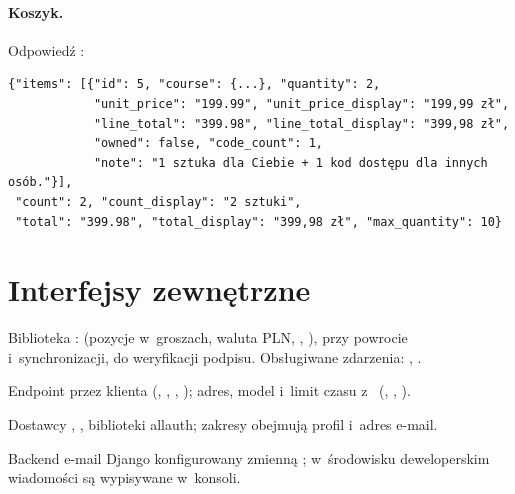 \paragraph{Koszyk.} Odpowiedź :

\begin{lstlisting}
{"items": [{"id": 5, "course": {...}, "quantity": 2,
            "unit_price": "199.99", "unit_price_display": "199,99 zł",
            "line_total": "399.98", "line_total_display": "399,98 zł",
            "owned": false, "code_count": 1,
            "note": "1 sztuka dla Ciebie + 1 kod dostępu dla innych osób."}],
 "count": 2, "count_display": "2 sztuki",
 "total": "399.98", "total_display": "399,98 zł", "max_quantity": 10}
\end{lstlisting}

\section{Interfejsy zewnętrzne}

\begin{description}[style=nextline,leftmargin=0.6cm,font=\sffamily\bfseries]
  \item[Stripe] Biblioteka :  (pozycje
        w~groszach, waluta PLN, , ),
         przy powrocie i~synchronizacji,
         do weryfikacji podpisu. Obsługiwane zdarzenia:
        , .
  \item[Ollama] Endpoint  przez klienta 
        (, , ,
        ); adres, model i~limit czasu z~
        (, , ).
  \item[OAuth2] Dostawcy , , 
        biblioteki allauth; zakresy obejmują profil i~adres e-mail.
  \item[SMTP] Backend e-mail Django konfigurowany zmienną ;
        w~środowisku deweloperskim wiadomości są wypisywane w~konsoli.
\end{description}
